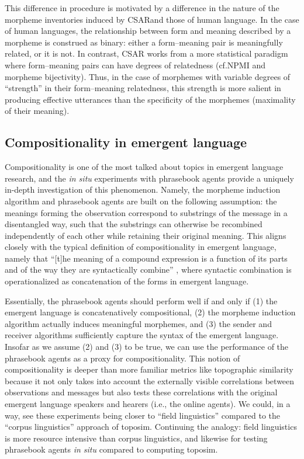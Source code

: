 This difference in procedure is motivated by a difference in the nature of the morpheme inventories induced by CSAR\@ and those of human language.
In the case of human languages, the relationship between form and meaning described by a morpheme is construed as binary: either a form--meaning pair is meaningfully related, or it is not.
In contrast, CSAR works from a more statistical paradigm where form--meaning pairs can have degrees of relatedness (cf.\@ NPMI and morpheme bijectivity).
Thus, in the case of morphemes with variable degrees of ``strength'' in their form--meaning relatedness, this strength is more salient in producing effective utterances than the specificity of the morphemes (maximality of their meaning).


\subsection{Compositionality in emergent language}

Compositionality is one of the most talked about topics in emergent language research, and the \emph{in situ} experiments with phrasebook agents provide a uniquely in-depth investigation of this phenomenon.
Namely, the morpheme induction algorithm and phrasebook agents are built on the following assumption: the meanings forming the observation correspond to substrings of the message in a disentangled way, such that the substrings can otherwise be recombined independently of each other while retaining their original meaning.
This aligns closely with the typical definition of compositionality in emergent language, namely that ``[t]he meaning of a compound expression is a function of its parts and of the way they are syntactically combine'' \citep{partee1984compositionality}, where syntactic combination is operationalized as concatenation of the forms in emergent language.

Essentially, the phrasebook agents should perform well if and only if
  (1) the emergent language is concatenatively compositional,
  (2) the morpheme induction algorithm actually induces meaningful morphemes,
  and (3) the sender and receiver algorithms sufficiently capture the syntax of the emergent language.
Insofar as we assume (2) and (3) to be true, we can use the performance of the phrasebook agents as a proxy for compositionality.
This notion of compositionality is deeper than more familiar metrics like topographic similarity because it not only takes into account the externally visible correlations between observations and messages but also tests these correlations with the original emergent language speakers and hearers (i.e., the online agents).
We could, in a way, see these experiments being closer to ``field linguistics'' compared to the ``corpus linguistics'' approach of toposim.
Continuing the analogy: field linguistics is more resource intensive than corpus linguistics, and likewise for testing phrasebook agents \emph{in situ} compared to computing toposim.

